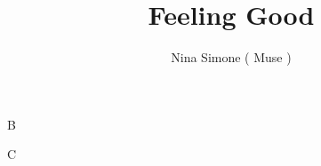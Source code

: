 \documentclass[DIV13,a4paper]{scrartcl}
\title{{\myfont Feeling Good}}
\author{Nina Simone ( Muse ) }
\date{}
\begin{document}
\maketitle


\begin{row}[cellsep=0.75cm]{2}{2}
	\begin{cell}{1}
	{\fontsize{7}{8}\selectfont
	
	}
	\end{cell}
	\begin{cell}{1}
B
	\end{cell}
	\begin{cell}{1}
C
	\end{cell}
\end{row}
\end{document}
